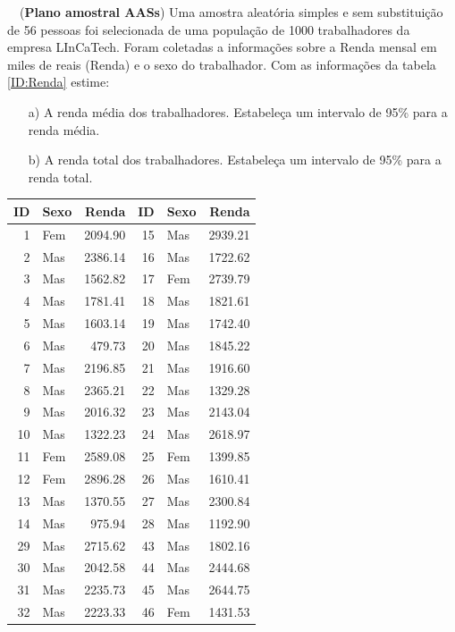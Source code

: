 \documentclass[a4paper,12pt,oneside,twocolumn]{Config/milktest}
\begin{document}
\medskip 
\question~~({\bf Plano amostral AASs}) Uma amostra aleatória simples e sem substituição de 56 pessoas foi selecionada de uma população de 1000 trabalhadores da empresa LInCaTech. Foram coletadas a informações sobre a Renda mensal em miles de reais (Renda) e o sexo do trabalhador. Com as informações da tabela \ref{ID:Renda} estime:

\begin{itemize}
    \item[a)] A renda média dos trabalhadores. Estabeleça um intervalo de 95\% para a renda média.
\item[b)] A renda total dos trabalhadores. Estabeleça um intervalo de 95\% para a renda total. 
\end{itemize}
{\small \begin{table}[H]
\centering
\begin{tabular}{rlr|rlr}
  \hline
ID & Sexo & Renda & ID & Sexo & Renda \\ 
  \hline
    1 & Fem & 2094.90 &   15 & Mas & 2939.21 \\
    2 & Mas & 2386.14 &   16 & Mas & 1722.62 \\
    3 & Mas & 1562.82 &   17 & Fem & 2739.79 \\
    4 & Mas & 1781.41 &   18 & Mas & 1821.61 \\
    5 & Mas & 1603.14 &   19 & Mas & 1742.40 \\
    6 & Mas &  479.73 &   20 & Mas & 1845.22 \\
    7 & Mas & 2196.85 &   21 & Mas & 1916.60 \\
    8 & Mas & 2365.21 &   22 & Mas & 1329.28 \\
    9 & Mas & 2016.32 &   23 & Mas & 2143.04 \\
   10 & Mas & 1322.23 &   24 & Mas & 2618.97 \\
   11 & Fem & 2589.08 &   25 & Fem & 1399.85 \\
   12 & Fem & 2896.28 &   26 & Mas & 1610.41 \\
   13 & Mas & 1370.55 &   27 & Mas & 2300.84 \\
   14 & Mas &  975.94 &   28 & Mas & 1192.90 \\ \hline   
   29 & Mas & 2715.62 &   43 & Mas & 1802.16 \\
   30 & Mas & 2042.58 &   44 & Mas & 2444.68 \\
   31 & Mas & 2235.73 &   45 & Mas & 2644.75 \\
   32 & Mas & 2223.33 &   46 & Fem & 1431.53 \\

\end{tabular}
\end{table}}
\end{document}
